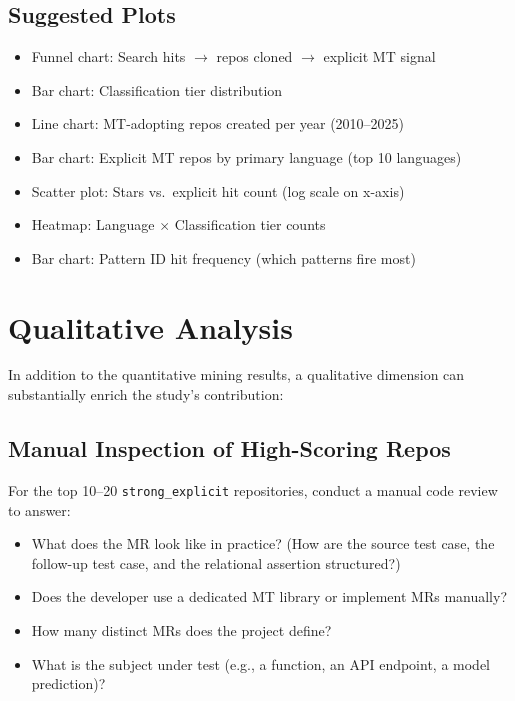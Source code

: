 \documentclass[12pt,a4paper]{article}
\begin{document}
\subsection{Suggested Plots}

\begin{itemize}
  \item Funnel chart: Search hits $\to$ repos cloned $\to$ explicit MT signal
  \item Bar chart: Classification tier distribution
  \item Line chart: MT-adopting repos created per year (2010--2025)
  \item Bar chart: Explicit MT repos by primary language (top 10 languages)
  \item Scatter plot: Stars vs.\ explicit hit count (log scale on x-axis)
  \item Heatmap: Language $\times$ Classification tier counts
  \item Bar chart: Pattern ID hit frequency (which patterns fire most)
\end{itemize}

\section{Qualitative Analysis}
\label{sec:qualitative}

In addition to the quantitative mining results, a qualitative dimension can
substantially enrich the study's contribution:

\subsection{Manual Inspection of High-Scoring Repos}

For the top 10--20 \texttt{strong\_explicit} repositories, conduct a manual
code review to answer:
\begin{itemize}
  \item What does the MR look like in practice? (How are the source test case,
        the follow-up test case, and the relational assertion structured?)
  \item Does the developer use a dedicated MT library or implement MRs manually?
  \item How many distinct MRs does the project define?
  \item What is the subject under test (e.g., a function, an API endpoint, a
        model prediction)?
\end{itemize}
\end{document}
